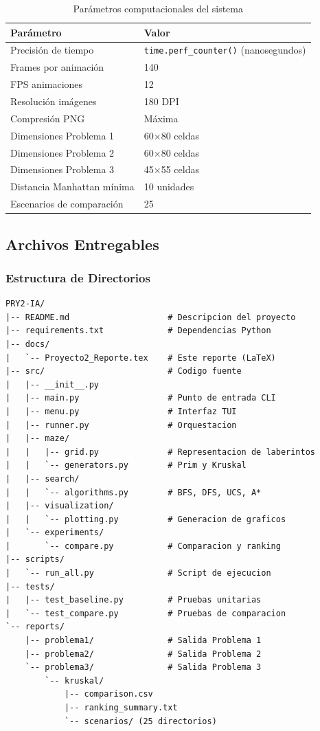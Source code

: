 \documentclass[12pt,a4paper]{article}
\begin{document}
\begin{table}[H]
\centering
\caption{Parámetros computacionales del sistema}
\begin{tabular}{|l|l|}
\hline
\textbf{Parámetro} & \textbf{Valor} \\
\hline
Precisión de tiempo & \texttt{time.perf\_counter()} (nanosegundos) \\
Frames por animación & 140 \\
FPS animaciones & 12 \\
Resolución imágenes & 180 DPI \\
Compresión PNG & Máxima \\
Dimensiones Problema 1 & 60×80 celdas \\
Dimensiones Problema 2 & 60×80 celdas \\
Dimensiones Problema 3 & 45×55 celdas \\
Distancia Manhattan mínima & 10 unidades \\
Escenarios de comparación & 25 \\
\hline
\end{tabular}
\end{table}

\subsection{Archivos Entregables}

\subsubsection{Estructura de Directorios}

\begin{verbatim}
PRY2-IA/
|-- README.md                    # Descripcion del proyecto
|-- requirements.txt             # Dependencias Python
|-- docs/
|   `-- Proyecto2_Reporte.tex    # Este reporte (LaTeX)
|-- src/                         # Codigo fuente
|   |-- __init__.py
|   |-- main.py                  # Punto de entrada CLI
|   |-- menu.py                  # Interfaz TUI
|   |-- runner.py                # Orquestacion
|   |-- maze/
|   |   |-- grid.py              # Representacion de laberintos
|   |   `-- generators.py        # Prim y Kruskal
|   |-- search/
|   |   `-- algorithms.py        # BFS, DFS, UCS, A*
|   |-- visualization/
|   |   `-- plotting.py          # Generacion de graficos
|   `-- experiments/
|       `-- compare.py           # Comparacion y ranking
|-- scripts/
|   `-- run_all.py               # Script de ejecucion
|-- tests/
|   |-- test_baseline.py         # Pruebas unitarias
|   `-- test_compare.py          # Pruebas de comparacion
`-- reports/
    |-- problema1/               # Salida Problema 1
    |-- problema2/               # Salida Problema 2
    `-- problema3/               # Salida Problema 3
        `-- kruskal/
            |-- comparison.csv
            |-- ranking_summary.txt
            `-- scenarios/ (25 directorios)
\end{verbatim}
\end{document}
